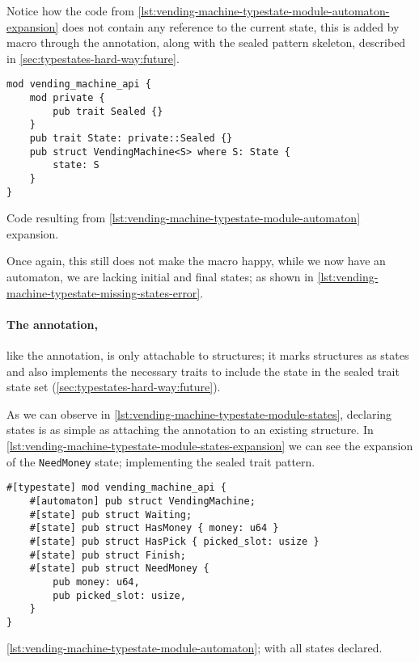 Notice how the code from \autoref{lst:vending-machine-typestate-module-automaton-expansion} does not contain any reference to the current state,
this is added by macro through the  annotation,
along with the sealed pattern skeleton, described in \autoref{sec:typestates-hard-way:future}.

\begin{listing}
    \begin{verbatim}
mod vending_machine_api {
    mod private {
        pub trait Sealed {}
    }
    pub trait State: private::Sealed {}
    pub struct VendingMachine<S> where S: State {
        state: S
    }
}
    \end{verbatim}
    \caption{Code resulting from \autoref{lst:vending-machine-typestate-module-automaton} expansion.}
    \label{lst:vending-machine-typestate-module-automaton-expansion}
\end{listing}

Once again, this still does not make the macro happy, while we now have an automaton, we are lacking initial and final states;
as shown in \autoref{lst:vending-machine-typestate-missing-states-error}.

\paragraph{The  annotation,} like the  annotation, is only attachable to structures;
it marks structures as states and also implements the necessary traits to include the state in the sealed trait state set (\autoref{sec:typestates-hard-way:future}).

As we can observe in \autoref{lst:vending-machine-typestate-module-states},
declaring states is as simple as attaching the annotation to an existing structure.
In \autoref{lst:vending-machine-typestate-module-states-expansion} we can see the expansion of the \texttt{NeedMoney} state;
implementing the sealed trait pattern.

\begin{listing}
    \begin{verbatim}
#[typestate] mod vending_machine_api {
    #[automaton] pub struct VendingMachine;
    #[state] pub struct Waiting;
    #[state] pub struct HasMoney { money: u64 }
    #[state] pub struct HasPick { picked_slot: usize }
    #[state] pub struct Finish;
    #[state] pub struct NeedMoney {
        pub money: u64,
        pub picked_slot: usize,
    }
}
    \end{verbatim}
    \caption{\autoref{lst:vending-machine-typestate-module-automaton}; with all states declared.}
    \label{lst:vending-machine-typestate-module-states}
\end{listing}

